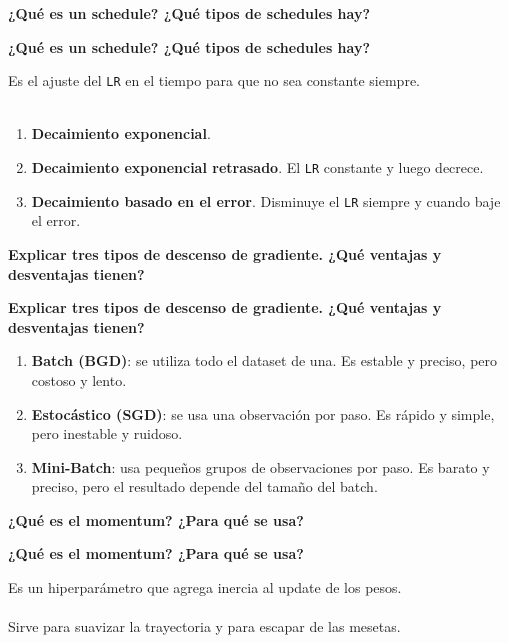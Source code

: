 \documentclass[10pt]{memoir}
\begin{document}
\clearpage
\begin{center}
	\textbf{\Large ¿Qué es un schedule? ¿Qué tipos de schedules hay?}
\end{center}

\clearpage
\begin{center}
	\textbf{\Large ¿Qué es un schedule? ¿Qué tipos de schedules hay?}
\end{center}
\noindent Es el ajuste del \texttt{LR} en el tiempo para que no sea constante siempre. \\
\\
\begin{enumerate}
	\item \textbf{Decaimiento exponencial}.
	\item \textbf{Decaimiento exponencial retrasado}. El \texttt{LR} constante y luego decrece.
	\item \textbf{Decaimiento basado en el error}. Disminuye el \texttt{LR} siempre y cuando baje el error.
\end{enumerate}

\clearpage
\begin{center}
	\textbf{\Large Explicar tres tipos de descenso de gradiente. ¿Qué ventajas y desventajas tienen?}
\end{center}

\clearpage
\begin{center}
	\textbf{\Large Explicar tres tipos de descenso de gradiente. ¿Qué ventajas y desventajas tienen?}
\end{center}
\begin{enumerate}
	\item \textbf{Batch (BGD)}: se utiliza todo el dataset de una. Es estable y preciso, pero costoso y lento.
	\item \textbf{Estocástico (SGD)}: se usa una observación por paso. Es rápido y simple, pero inestable y ruidoso.
	\item \textbf{Mini-Batch}: usa pequeños grupos de observaciones por paso. Es barato y preciso, pero el resultado depende del tamaño del batch.
\end{enumerate}

\clearpage
\begin{center}
	\textbf{\Large ¿Qué es el momentum? ¿Para qué se usa?}
\end{center}

\clearpage
\begin{center}
	\textbf{\Large ¿Qué es el momentum? ¿Para qué se usa?}
\end{center}
\noindent Es un hiperparámetro que agrega inercia al update de los pesos. \\
\\
\noindent Sirve para suavizar la trayectoria y para escapar de las mesetas.
\end{document}
